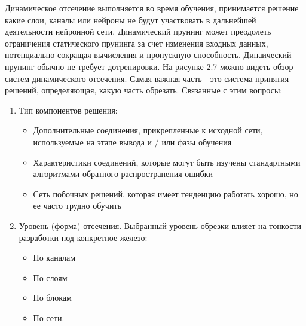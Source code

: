 \documentclass[oneside,final,12pt]{extreport}
\begin{document}
Динамическое отсечение выполняется во время обучения, принимается решение какие слои, каналы или нейроны не будут участвовать в дальнейшей деятельности нейронной сети. Динамический прунинг может преодолеть ограничения статического прунинга за счет изменения входных данных, потенциально сокращая вычисления и пропускную способность. Динаический прунинг обычно не требует дотренировки. На рисунке 2.7 можно видеть обзор систем динамического отсечения. Самая важная часть - это система принятия решений, определяющая, какую часть обрезать. Связанные с этим вопросы:
\begin{enumerate}
    \item Тип компонентов решения:
    \begin{itemize}
        \item Дополнительные соединения, прикрепленные к исходной сети, используемые на этапе вывода и / или фазы обучения
        \item Характеристики соединений, которые могут быть изучены стандартными алгоритмами обратного распространения ошибки
	    \item Сеть побочных решений, которая имеет тенденцию работать хорошо, но ее часто трудно обучить
    \end{itemize}
    \item Уровень (форма) отсечения. Выбранный уровень обрезки влияет на тонкости разработки под конкретное железо:
    \begin{itemize}
        \item По каналам 
        \item По слоям
        \item По блокам
        \item По сети.
    \end{itemize}


\end{enumerate}
\end{document}
